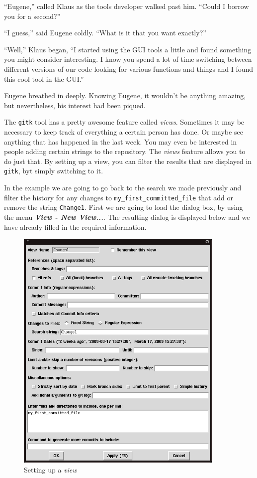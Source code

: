 \begin{trenches}
``Eugene,'' called Klaus as the tools developer walked past him.
``Could I borrow you for a second?''

``I guess,'' said Eugene coldly.
``What is it that you want exactly?''

``Well,'' Klaus began,
``I started using the GUI tools a little and found something you might consider interesting. I know you spend a lot of time switching between different versions of our code looking for various functions and things and I found this cool tool in the GUI.''

Eugene breathed in deeply.
Knowing Eugene, it wouldn't be anything amazing, but nevertheless, his interest had been piqued.
\end{trenches}

The \texttt{gitk} tool has a pretty awesome feature called \emph{views}.
Sometimes it may be necessary to keep track of everything a certain person has done.
Or maybe see anything that has happened in the last week.
You may even be interested in people adding certain strings to the repository.
The \emph{views} feature allows you to do just that.
By setting up a view, you can filter the results that are displayed in \texttt{gitk}, byt simply switching to it.

In the example we are going to go back to the search we made previously and filter the history for any changes to \texttt{my\_first\_committed\_file} that add or remove the string \texttt{Change1}.
First we are going to load the dialog box, by using the menu \textbf{\emph{View - New View...}}.
The resulting dialog is displayed below and we have already filled in the required information.

\begin{figure}[hbt]
\centering
\includegraphics[width=10cm]{images/f-w5-d13.png}
\caption{Setting up a \emph{view}}
\end{figure}

